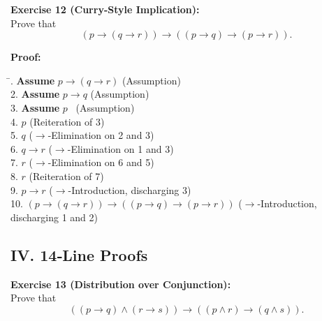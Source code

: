 \documentclass[12pt]{article}
\begin{document}
\bigskip
\textbf{Exercise 12 (Curry-Style Implication):}\\[0.3em]
Prove that 
\[
(p\to (q\to r))\to ((p\to q)\to (p\to r)).
\]

\textbf{Proof:}
\begin{tabbing}
\hspace*{2cm}\= . \quad \textbf{Assume } \(p\to (q\to r)\) \quad \quad (Assumption)\\[0.5em]
2. \quad \textbf{Assume } \(p\to q\) \quad \quad \quad (Assumption)\\[0.5em]
3. \quad \textbf{Assume } \(p\) \quad \quad \quad \ (Assumption)\\[0.5em]
4. \quad \(p\) \quad \quad \quad (Reiteration of 3)\\[0.5em]
5. \quad \(q\) \quad \quad \quad (\(\to\)-Elimination on 2 and 3)\\[0.5em]
6. \quad \(q\to r\) \quad \quad (\(\to\)-Elimination on 1 and 3)\\[0.5em]
7. \quad \(r\) \quad \quad \quad (\(\to\)-Elimination on 6 and 5)\\[0.5em]
8. \quad \(r\) \quad \quad \quad (Reiteration of 7)\\[0.5em]
9. \quad \(p\to r\) \quad \quad (\(\to\)-Introduction, discharging 3)\\[0.5em]
10. \quad \((p\to (q\to r))\to ((p\to q)\to (p\to r))\) \quad (\(\to\)-Introduction, discharging 1 and 2)
\end{tabbing}

\subsection{IV. 14‐Line Proofs}

\bigskip
\textbf{Exercise 13 (Distribution over Conjunction):}\\[0.3em]
Prove that 
\[
((p\to q)\land (r\to s))\to ((p\land r)\to (q\land s)).
\]
\end{document}
